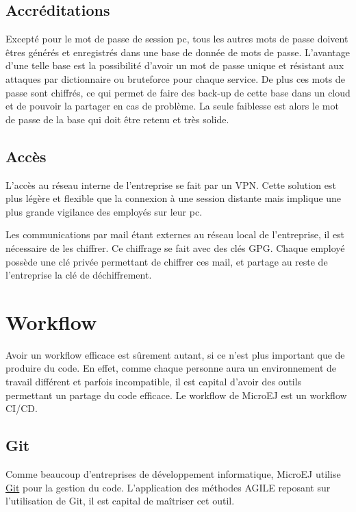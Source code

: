 \documentclass[french,a4paper,12pt]{report}
\begin{document}
\subsection{Accréditations}

Excepté pour le mot de passe de session pc, tous les autres mots de passe doivent êtres générés et enregistrés dans une base de donnée de mots de passe. L’avantage d’une telle base est la possibilité d’avoir un mot de passe unique et résistant aux attaques par dictionnaire ou bruteforce pour chaque service. De plus ces mots de passe sont chiffrés, ce qui permet de faire des back-up de cette base dans un cloud et de pouvoir la partager en cas de problème. La seule faiblesse est alors le mot de passe de la base qui doit être retenu et très solide.

\subsection{Accès}

L’accès au réseau interne de l’entreprise se fait par un VPN. Cette solution est plus légère et flexible que la connexion à une session distante mais implique une plus grande vigilance des employés sur leur pc. 

Les communications par mail étant externes au réseau local de l’entreprise, il est nécessaire de les chiffrer. Ce chiffrage se fait avec des clés GPG. Chaque employé possède une clé privée permettant de chiffrer ces mail, et partage au reste de l'entreprise la clé de déchiffrement. 

\section{Workflow}

Avoir un workflow efficace est sûrement autant, si ce n’est plus important que de produire du code. En effet, comme chaque personne aura un environnement de travail différent et parfois incompatible, il est capital d’avoir des outils permettant un partage du code efficace. Le workflow de MicroEJ est un workflow CI/CD.

\subsection{Git}

Comme beaucoup d'entreprises de développement informatique, MicroEJ utilise \href{https://git-scm.com/}{Git} pour la gestion du code. L'application des méthodes AGILE reposant sur l'utilisation de Git, il est capital de maîtriser cet outil.
\end{document}
